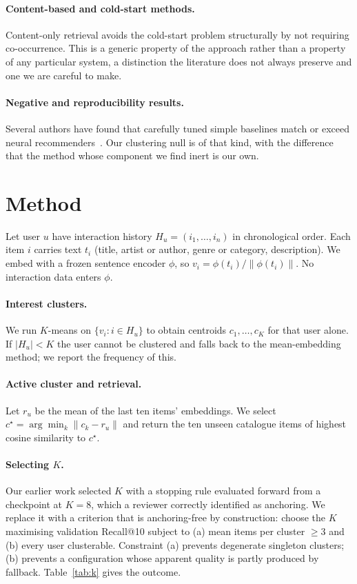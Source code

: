 \documentclass[runningheads]{llncs}
\begin{document}
\paragraph{Content-based and cold-start methods.} Content-only retrieval avoids the
cold-start problem structurally by not requiring co-occurrence. This is a generic property
of the approach rather than a property of any particular system, a distinction the
literature does not always preserve and one we are careful to make.

\paragraph{Negative and reproducibility results.} Several authors have found that carefully
tuned simple baselines match or exceed neural recommenders~\cite{dacrema2019really,rendle2020neural}.
Our clustering null is of that kind, with the difference that the method whose component we
find inert is our own.

\section{Method}

Let user $u$ have interaction history $H_u = (i_1,\dots,i_n)$ in chronological order. Each
item $i$ carries text $t_i$ (title, artist or author, genre or category, description). We
embed with a frozen sentence encoder $\phi$, so $v_i = \phi(t_i)/\lVert\phi(t_i)\rVert$.
No interaction data enters $\phi$.

\paragraph{Interest clusters.} We run $K$-means on $\{v_i : i \in H_u\}$ to obtain
centroids $c_1,\dots,c_K$ for that user alone. If $|H_u| < K$ the user cannot be clustered
and falls back to the mean-embedding method; we report the frequency of this.

\paragraph{Active cluster and retrieval.} Let $r_u$ be the mean of the last ten items'
embeddings. We select $c^\star = \arg\min_k \lVert c_k - r_u \rVert$ and return the ten
unseen catalogue items of highest cosine similarity to $c^\star$.

\paragraph{Selecting $K$.} Our earlier work selected $K$ with a stopping rule evaluated
forward from a checkpoint at $K=8$, which a reviewer correctly identified as anchoring.
We replace it with a criterion that is anchoring-free by construction: choose the $K$
maximising validation Recall@10 subject to (a) mean items per cluster $\geq 3$ and
(b) every user clusterable. Constraint (a) prevents degenerate singleton clusters;
(b) prevents a configuration whose apparent quality is partly produced by fallback.
Table~\ref{tab:k} gives the outcome.
\end{document}

